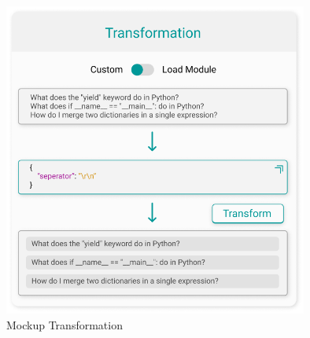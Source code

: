 \begin{figure}[H]
  \centering
    \includegraphics[width = 10cm]{bilder/mockupTransformation}
    \caption{Mockup Transformation}
\end{figure}

